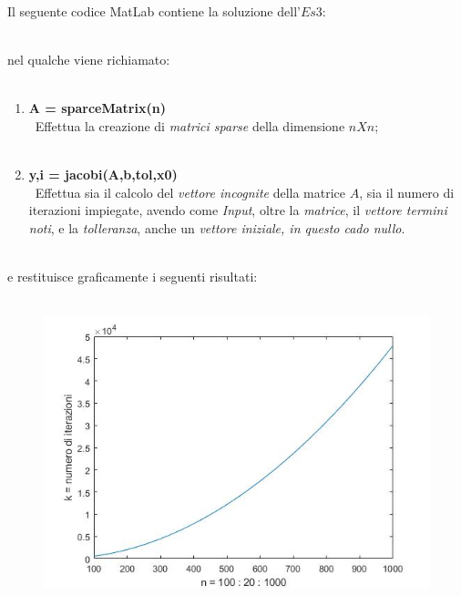 Il seguente codice MatLab contiene la soluzione dell'$Es 3$:\\\
	
nel qualche viene richiamato:\\\
	\begin{enumerate}
		\item \textbf{A = sparceMatrix(n)}\\\
			Effettua la creazione di \textit{matrici sparse} della dimensione $nXn$;\\\
		\item \textbf{y,i = jacobi(A,b,tol,x0)}\\\
			Effettua sia il calcolo del \textit{vettore incognite} della matrice $A$, sia il numero di iterazioni impiegate, avendo come \textit{Input}, oltre la 	\textit{matrice}, il \textit{vettore termini noti}, e la \textit{tolleranza}, anche un \textit{vettore iniziale, in questo cado nullo}.\\\
			
	\end{enumerate}
e restituisce graficamente i seguenti risultati:\\\
	\begin{figure}[H]
		\includegraphics[width=\textwidth]{Plot/Cap_6_Es_3}
	\end{figure}